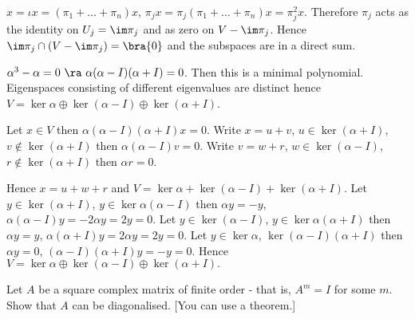 \begin{solution}[\bf Solution.]
$x=\iota x = (\pi_1 + \dots + \pi_n)x$, $\pi_j x = \pi_j(\pi_1 + \dots + \pi_n)x = \pi_j^2 x$. Therefore $\pi_j$ acts as the identity on $U_j = \im \pi_j$ and as zero on $V-\im \pi_j$. Hence $\im \pi_j \cap (V-\im \pi_j)= \bra{0}$ and the subspaces are in a direct sum.

$\alpha^3 - \alpha = 0 \ \ra \ \alpha (\alpha - I)(\alpha + I) = 0$. Then this is a minimal polynomial. Eigenspaces consisting of different eigenvalues are distinct hence $V =\ker \alpha \oplus \ker(\alpha - I)\oplus \ker (\alpha + I)$.

Let $x\in V$ then $\alpha (\alpha - I)(\alpha + I) x = 0$. Write $x=u+v$, $u\in \ker(\alpha +I)$, $v\notin \ker(\alpha +I)$ then $\alpha (\alpha - I)v = 0$. Write $v=w+r$, $w \in \ker(\alpha -I)$, $r\notin \ker(\alpha+ I)$ then $\alpha r = 0$.

Hence $x = u + w+ r$ and $V = \ker \alpha + \ker(\alpha - I) + \ker(\alpha + I) $. Let $y\in \ker(\alpha + I)$, $y\in \ker \alpha (\alpha - I)$ then $\alpha y = -y$, $\alpha (\alpha - I)y = -2\alpha y = 2y = 0$. Let $y \in \ker(\alpha -I)$, $y \in \ker\alpha (\alpha +I) $ then $\alpha y = y$, $\alpha (\alpha + I)y = 2\alpha y = 2y  =0$. Let $y\in \ker \alpha$, $\ker(\alpha - I)(\alpha + I) $ then $\alpha y = 0$, $ (\alpha - I)(\alpha + I) y = -y = 0$. Hence $V= \ker \alpha \oplus \ker (\alpha - I)\oplus \ker(\alpha + I).$ 
\end{solution}


\begin{problem}
Let $A$ be a square complex matrix of finite order - that is, $A^m = I$ for some $m$. Show that $A$ can be diagonalised. [You can use a theorem.]
\end{problem}

